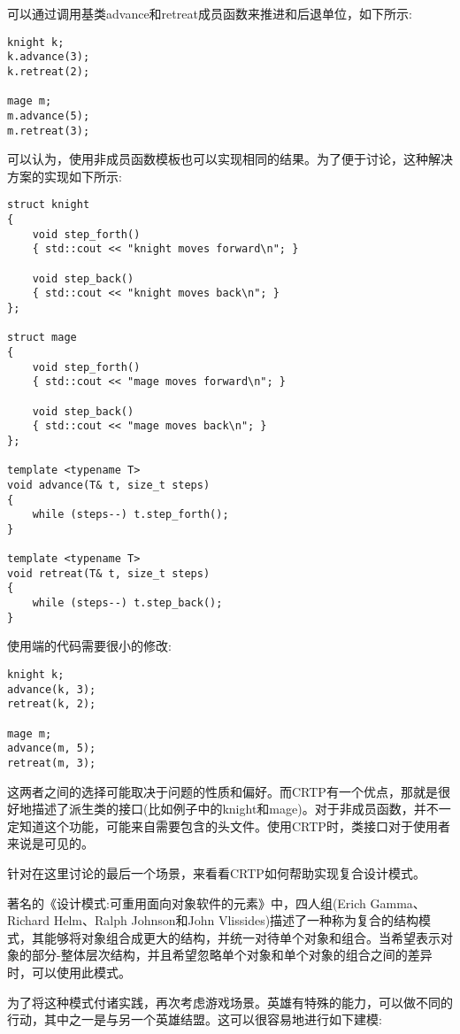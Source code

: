 可以通过调用基类advance和retreat成员函数来推进和后退单位，如下所示:

\begin{lstlisting}[style=styleCXX]
knight k;
k.advance(3);
k.retreat(2);

mage m;
m.advance(5);
m.retreat(3);
\end{lstlisting}

可以认为，使用非成员函数模板也可以实现相同的结果。为了便于讨论，这种解决方案的实现如下所示:

\begin{lstlisting}[style=styleCXX]
struct knight
{
	void step_forth()
	{ std::cout << "knight moves forward\n"; }
	
	void step_back()
	{ std::cout << "knight moves back\n"; }
};

struct mage
{
	void step_forth()
	{ std::cout << "mage moves forward\n"; }
	
	void step_back()
	{ std::cout << "mage moves back\n"; }
};

template <typename T>
void advance(T& t, size_t steps)
{
	while (steps--) t.step_forth();
}

template <typename T>
void retreat(T& t, size_t steps)
{
	while (steps--) t.step_back();
}
\end{lstlisting}

使用端的代码需要很小的修改:

\begin{lstlisting}[style=styleCXX]
knight k;
advance(k, 3);
retreat(k, 2);

mage m;
advance(m, 5);
retreat(m, 3);
\end{lstlisting}

这两者之间的选择可能取决于问题的性质和偏好。而CRTP有一个优点，那就是很好地描述了派生类的接口(比如例子中的knight和mage)。对于非成员函数，并不一定知道这个功能，可能来自需要包含的头文件。使用CRTP时，类接口对于使用者来说是可见的。

针对在这里讨论的最后一个场景，来看看CRTP如何帮助实现复合设计模式。


著名的《设计模式:可重用面向对象软件的元素》中，四人组(Erich Gamma、Richard Helm、Ralph Johnson和John Vlissides)描述了一种称为复合的结构模式，其能够将对象组合成更大的结构，并统一对待单个对象和组合。当希望表示对象的部分-整体层次结构，并且希望忽略单个对象和单个对象的组合之间的差异时，可以使用此模式。

为了将这种模式付诸实践，再次考虑游戏场景。英雄有特殊的能力，可以做不同的行动，其中之一是与另一个英雄结盟。这可以很容易地进行如下建模:

